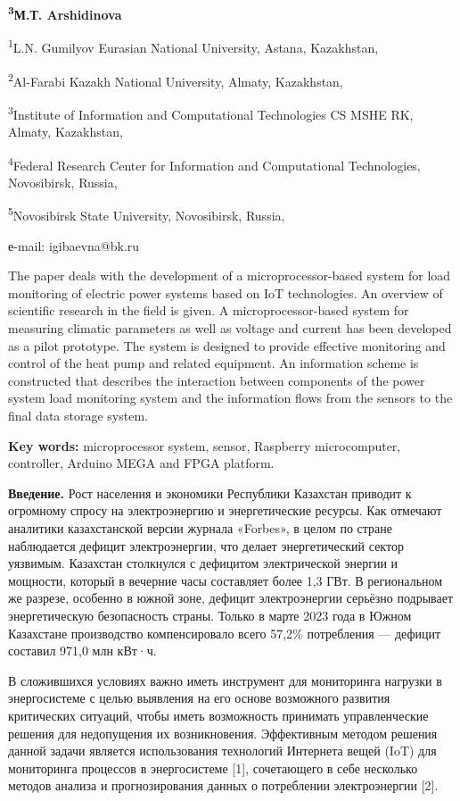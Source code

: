 {\bfseries \textsuperscript{3}М.Т. Arshidinova}

\textsuperscript{1}L.N. Gumilyov Eurasian National University, Astana,
Kazakhstan,

\textsuperscript{2}Al-Farabi Kazakh National University, Almaty,
Kazakhstan,

\textsuperscript{3}Institute of Information and Computational
Technologies CS MSHE RK, Almaty, Kazakhstan,

\textsuperscript{4}Federal Research Center for Information and
Computational Technologies, Novosibirsk, Russia,

\textsuperscript{5}Novosibirsk State University, Novosibirsk, Russia,

е-mail: igibaevna@bk.ru

The paper deals with the development of a microprocessor-based system
for load monitoring of electric power systems based on IoT technologies.
An overview of scientific research in the field is given. A
microprocessor-based system for measuring climatic parameters as well as
voltage and current has been developed as a pilot prototype. The system
is designed to provide effective monitoring and control of the heat pump
and related equipment. An information scheme is constructed that
describes the interaction between components of the power system load
monitoring system and the information flows from the sensors to the
final data storage system.

{\bfseries Key words:} microprocessor system, sensor, Raspberry
microcomputer, controller, Arduino MEGA and FPGA platform.

{\bfseries Введение.} Рост населения и экономики Республики Казахстан
приводит к огромному спросу на электроэнергию и энергетические ресурсы.
Как отмечают аналитики казахстанской версии журнала «Forbes», в целом по
стране наблюдается дефицит электроэнергии, что делает энергетический
сектор уязвимым. Казахстан столкнулся с дефицитом электрической энергии
и мощности, который в вечерние часы составляет более 1,3 ГВт. В
региональном же разрезе, особенно в южной зоне, дефицит электроэнергии
серьёзно подрывает энергетическую безопасность страны. Только в марте
2023 года в Южном Казахстане производство компенсировало всего 57,2\%
потребления --- дефицит составил 971,0 млн кВт·ч.

В сложившихся условиях важно иметь инструмент для мониторинга нагрузки в
энергосистеме с целью выявления на его основе возможного развития
критических ситуаций, чтобы иметь возможность принимать управленческие
решения для недопущения их возникновения. Эффективным методом решения
данной задачи является использования технологий Интернета вещей (IoT)
для мониторинга процессов в энергосистеме {[}1{]}, сочетающего в себе
несколько методов анализа и прогнозирования данных о потреблении
электроэнергии {[}2{]}.

